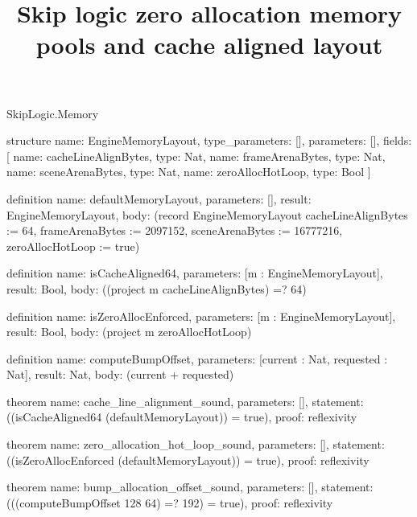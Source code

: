 \begin{lexlean}{SkipLogic.Memory}
\title{Skip logic zero allocation memory pools and cache aligned layout}
\begin{semanticmodule}
structure{
  name: EngineMemoryLayout,
  type_parameters: [],
  parameters: [],
  fields: [
    {name: cacheLineAlignBytes, type: Nat},
    {name: frameArenaBytes, type: Nat},
    {name: sceneArenaBytes, type: Nat},
    {name: zeroAllocHotLoop, type: Bool}
  ]
}

definition{
  name: defaultMemoryLayout,
  parameters: [],
  result: EngineMemoryLayout,
  body: (record EngineMemoryLayout {cacheLineAlignBytes := 64, frameArenaBytes := 2097152, sceneArenaBytes := 16777216, zeroAllocHotLoop := true})
}

definition{
  name: isCacheAligned64,
  parameters: [m : EngineMemoryLayout],
  result: Bool,
  body: ((project m cacheLineAlignBytes) =? 64)
}

definition{
  name: isZeroAllocEnforced,
  parameters: [m : EngineMemoryLayout],
  result: Bool,
  body: (project m zeroAllocHotLoop)
}

definition{
  name: computeBumpOffset,
  parameters: [current : Nat, requested : Nat],
  result: Nat,
  body: (current + requested)
}

theorem{
  name: cache_line_alignment_sound,
  parameters: [],
  statement: ((isCacheAligned64 (defaultMemoryLayout)) = true),
  proof: reflexivity{}
}

theorem{
  name: zero_allocation_hot_loop_sound,
  parameters: [],
  statement: ((isZeroAllocEnforced (defaultMemoryLayout)) = true),
  proof: reflexivity{}
}

theorem{
  name: bump_allocation_offset_sound,
  parameters: [],
  statement: (((computeBumpOffset 128 64) =? 192) = true),
  proof: reflexivity{}
}
\end{semanticmodule}
\end{lexlean}
